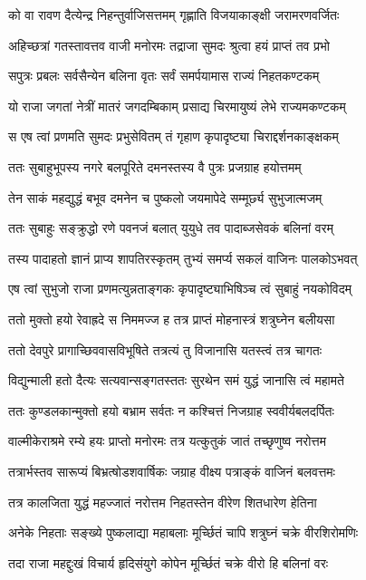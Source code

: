 \twolineshloka
{को वा रावण दैत्येन्द्र निहन्तुर्वाजिसत्तमम्}
{गृह्णाति विजयाकाङ्क्षी जरामरणवर्जितः}%

\twolineshloka
{अहिच्छत्रां गतस्तावत्तव वाजी मनोरमः}
{तद्राजा सुमदः श्रुत्वा हयं प्राप्तं तव प्रभो}%

\twolineshloka
{सपुत्रः प्रबलः सर्वसैन्येन बलिना वृतः}
{सर्वं समर्पयामास राज्यं निहतकण्टकम्}%

\twolineshloka
{यो राजा जगतां नेत्रीं मातरं जगदम्बिकाम्}
{प्रसाद्य चिरमायुष्यं लेभे राज्यमकण्टकम्}%

\twolineshloka
{स एष त्वां प्रणमति सुमदः प्रभुसेवितम्}
{तं गृहाण कृपादृष्ट्या चिराद्दर्शनकाङ्क्षकम्}%

\twolineshloka
{ततः सुबाहुभूपस्य नगरे बलपूरिते}
{दमनस्तस्य वै पुत्रः प्रजग्राह हयोत्तमम्}%

\twolineshloka
{तेन साकं महद्युद्धं बभूव दमनेन च}
{पुष्कलो जयमापेदे सम्मूर्छ्य सुभुजात्मजम्}%

\twolineshloka
{ततः सुबाहुः सङ्क्रुद्धो रणे पवनजं बलात्}
{युयुधे तव पादाब्जसेवकं बलिनां वरम्}%

\twolineshloka
{तस्य पादाहतो ज्ञानं प्राप्य शापतिरस्कृतम्}
{तुभ्यं समर्प्य सकलं वाजिनः पालकोऽभवत्}%

\twolineshloka
{एष त्वां सुभुजो राजा प्रणमत्युन्नताङ्गकः}
{कृपादृष्ट्याभिषिञ्च त्वं सुबाहुं नयकोविदम्}%

\twolineshloka
{ततो मुक्तो हयो रेवाह्रदे स निममज्ज ह}
{तत्र प्राप्तं मोहनास्त्रं शत्रुघ्नेन बलीयसा}%

\twolineshloka
{ततो देवपुरे प्रागाच्छिववासविभूषिते}
{तत्रत्यं तु विजानासि यतस्त्वं तत्र चागतः}%

\twolineshloka
{विद्युन्माली हतो दैत्यः सत्यवान्सङ्गतस्ततः}
{सुरथेन समं युद्धं जानासि त्वं महामते}%

\twolineshloka
{ततः कुण्डलकान्मुक्तो हयो बभ्राम सर्वतः}
{न कश्चित्तं निजग्राह स्ववीर्यबलदर्पितः}%

\twolineshloka
{वाल्मीकेराश्रमे रम्ये हयः प्राप्तो मनोरमः}
{तत्र यत्कुतुकं जातं तच्छृणुष्व नरोत्तम}%

\twolineshloka
{तत्रार्भस्तव सारूप्यं बिभ्रत्षोडशवार्षिकः}
{जग्राह वीक्ष्य पत्राङ्कं वाजिनं बलवत्तमः}%

\twolineshloka
{तत्र कालजिता युद्धं महज्जातं नरोत्तम}
{निहतस्तेन वीरेण शितधारेण हेतिना}%

\twolineshloka
{अनेके निहताः सङ्ख्ये पुष्कलाद्या महाबलाः}
{मूर्च्छितं चापि शत्रुघ्नं चक्रे वीरशिरोमणिः}%

\twolineshloka
{तदा राजा महद्दुःखं विचार्य हृदिसंयुगे}
{कोपेन मूर्च्छितं चक्रे वीरो हि बलिनां वरः}%

